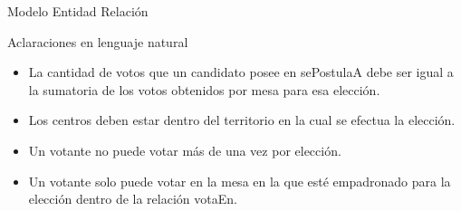 \begin{section}{Modelo Entidad Relaci\'on}
\begin{subsection}{Aclaraciones en lenguaje natural}
\begin{itemize}
\item La cantidad de votos que un candidato posee en sePostulaA debe ser igual a la sumatoria de los votos obtenidos por mesa para esa elecci\'on.

\item Los centros deben estar dentro del territorio en la cual se efectua la elecci\'on.

\item Un votante no puede votar m\'as de una vez por elecci\'on.

\item Un votante solo puede votar en la mesa en la que est\'e empadronado para la elecci\'on dentro de la relaci\'on votaEn.

\end{itemize}

\end{subsection}

\end{section}
